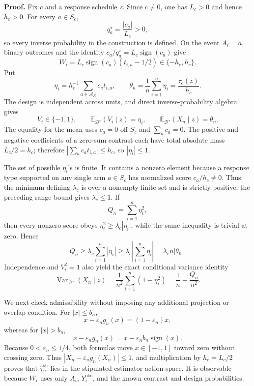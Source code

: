\textbf{Proof.}
Fix \(c\) and a response schedule \(z\). Since \(c\neq0\), one has \(L_c>0\) and hence \(h_c>0\). For every \(a\in S_c\),
\[
 q_a^\star=\frac{|c_a|}{L_c}>0,
\]
so every inverse probability in the construction is defined. On the event \(A_i=a\), binary outcomes and the identity \(c_a/q_a^\star=L_c\operatorname{sign}(c_a)\) give
\[
 W_i=L_c\operatorname{sign}(c_a)(t_{i,a}-1/2)\in\{-h_c,h_c\}.
\]
Put
\[
 \eta_i=h_c^{-1}\sum_{a\in\mathcal A_K}c_at_{i,a},
 \qquad
 \theta_n=\frac1n\sum_{i=1}^n\eta_i
 =\frac{\tau_c(z)}{h_c}.
\]
The design is independent across units, and direct inverse-probability algebra gives
\[
 V_i\in\{-1,1\},
 \qquad
 \mathbb E_{\mathcal D^\star}(V_i\mid z)=\eta_i,
 \qquad
 \mathbb E_{\mathcal D^\star}(X_n\mid z)=\theta_n.
\]
The equality for the mean uses \(c_a=0\) off \(S_c\) and \(\sum_a c_a=0\). The positive and negative coefficients of a zero-sum contrast each have total absolute mass \(L_c/2=h_c\); therefore \(|\sum_ac_at_{i,a}|\leq h_c\), so \(|\eta_i|\leq1\).

The set of possible \(\eta_i\)'s is finite. It contains a nonzero element because a response type supported on any single arm \(a\in S_c\) has normalized score \(c_a/h_c\neq0\). Thus the minimum defining \(\lambda_c\) is over a nonempty finite set and is strictly positive; the preceding range bound gives \(\lambda_c\leq1\). If
\[
 Q_n=\sum_{i=1}^n\eta_i^2,
\]
then every nonzero score obeys \(\eta_i^2\geq\lambda_c|\eta_i|\), while the same inequality is trivial at zero. Hence
\[
 Q_n\geq\lambda_c\sum_{i=1}^n|\eta_i|
 \geq\lambda_c\left|\sum_{i=1}^n\eta_i\right|
 =\lambda_cn|\theta_n|.
\]
Independence and \(V_i^2=1\) also yield the exact conditional variance identity
\[
 \operatorname{Var}_{\mathcal D^\star}(X_n\mid z)
 =\frac1{n^2}\sum_{i=1}^n(1-\eta_i^2)
 =\frac1n-\frac{Q_n}{n^2}.
\]

We next check admissibility without imposing any additional projection or overlap condition. For \(|x|\leq b_n\),
\[
 x-\varepsilon_ng_n(x)=(1-\varepsilon_n)x,
\]
whereas for \(|x|>b_n\),
\[
 x-\varepsilon_ng_n(x)=x-\varepsilon_nb_n\operatorname{sign}(x).
\]
Because \(0<\varepsilon_n\leq1/4\), both formulas move \(x\in[-1,1]\) toward zero without crossing zero. Thus \(|X_n-\varepsilon_ng_n(X_n)|\leq1\), and multiplication by \(h_c=L_c/2\) proves that \(\widehat\tau_n^{\mathrm{sh}}\) lies in the stipulated estimator action space. It is observable because \(W_i\) uses only \(A_i\), \(Y_i^{\mathrm{obs}}\), and the known contrast and design probabilities.

